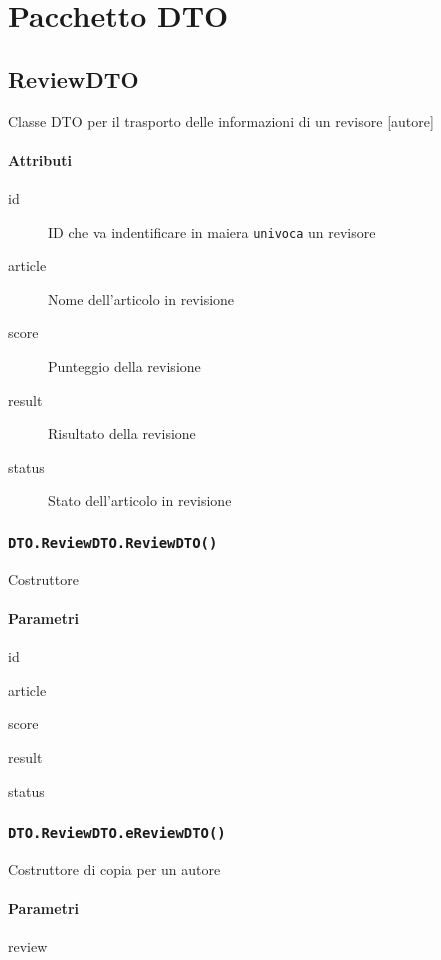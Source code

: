 \section{Pacchetto DTO}
\label{sec:package_dto}

\subsection{ReviewDTO}
Classe DTO per il trasporto delle informazioni di un revisore [autore]
\paragraph{Attributi}
\begin{description}
\item [id] ID che va indentificare in maiera \texttt{univoca} un revisore
\item [article] Nome dell'articolo in revisione
\item [score] Punteggio della revisione
\item [result] Risultato della revisione
\item [status] Stato dell'articolo in revisione
\end{description}
\subsubsection{\texttt{DTO.ReviewDTO.ReviewDTO()}}
Costruttore
\paragraph{Parametri}
\begin{description}
\item id
\item article
\item score
\item result
\item status
\end{description}
\subsubsection{\texttt{DTO.ReviewDTO.eReviewDTO()}}
Costruttore di copia per un autore
\paragraph{Parametri}
\begin{description}
\item review
\end{description}
